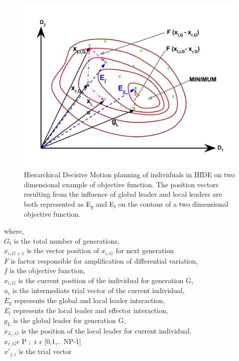 \documentclass[a4paper,twoside]{article}
\begin{document}
\begin{figure}[h!]
  \includegraphics[scale=0.24]{contourDL}
  \caption{Hierarchical Decisive Motion planning of individuals in HIDE on two dimensional example of objective function. The position vectors resulting from the influence of global leader and local leaders are both represented
as E$_{g}$ and E$_{l}$ on the contour of a two dimensional objective function.}
  \label{fig:contourDL}
\end{figure}


where, \\
$G_{t}$ is the total number of generations,\\
$x_{i,G+1}$ is the vector position of $x_{i,G}$ for next generation\\
$F$ is factor responsible for amplification of differential variation, \\
$f$ is the objective function, \\
$x_{i,G}$ is the current position of the individual for generation G,\\
$u_i$ is the intermediate trial vector of the current individual,\\
$E_g$ represents the global and local leader interaction,\\
$E_l$ represents the local leader and effector interaction,\\
$g_L$ is the global leader for generation G, \\
$x_{L_i,G}$ is the position of the local leader for current individual,\\
$x_{r,G} \epsilon$ P $;$  \thinspace r $\epsilon$ [0,1,.. NP-1] \\
$x'_{j,i}$ is the trial vector\\
\end{document}
